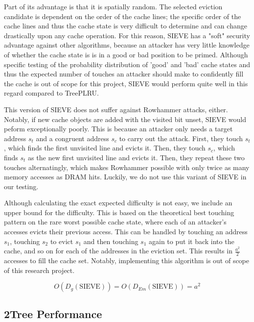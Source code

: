 \documentclass[letterpaper]{article}
\begin{document}
Part of its advantage is that it is spatially random.
The selected eviction candidate is dependent on the order of the cache lines;
the specific order of the cache lines and thus the cache state is very difficult to determine
and can change drastically upon any cache operation.
For this reason, SIEVE has a "soft" security advantage against other algorithms,
because an attacker has very little knowledge of whether the cache state is
is in a good or bad position to be primed.
Although specific testing of the probability distribution of 'good' and 'bad' cache states
and thus the expected number of touches an attacker should make to confidently fill the cache
is out of scope for this project,
SIEVE would perform quite well in this regard compared to TreePLRU.

This version of SIEVE does not suffer against Rowhammer attacks, either.
Notably, if new cache objects are added with the visited bit unset, SIEVE would peform exceptionally poorly.
This is because an attacker only needs a target address
$s_t$ and a congruent address $s_c$ to carry out the attack.
First, they touch $s_t$, which finds the first unvisited line and evicts it.
Then, they touch $s_c$, which finds $s_t$ as the new first unvisited line and evicts it.
Then, they repeat these two touches alternatingly, which makes Rowhammer possible
with only twice as many memory accesses as DRAM hits.
Luckily, we do not use this variant of SIEVE in our testing.

Although calculating the exact expected difficulty is not easy,
we include an upper bound for the difficulty.
This is based on the theoretical best touching pattern
on the rare worst possible cache state,
where each of an attacker's accesses evicts their previous access.
This can be handled by touching an address $s_1$,
touching $s_2$ to evict $s_1$ and then touching $s_1$ again to put it back into the cache,
and so on for each of the addresses in the eviction set.
This results in $\frac{a^2}{2}$ accesses to fill the cache set.
Notably, implementing this algorithm is out of scope of this research project.

\begin{equation}
  O(D_g(\text{SIEVE})) = O(D_{Em}(\text{SIEVE})) = a^2
  \label{eq:sieveed}
\end{equation}


\subsection{2Tree Performance}
\end{document}
